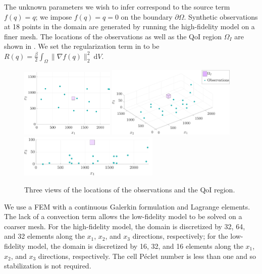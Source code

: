 \documentclass[review,sort&compress]{elsarticle}
\providecommand{\DIFaddtex}[1]{{\protect\color{blue}\uwave{#1}}} %
\providecommand{\DIFdeltex}[1]{{\protect\color{red}\sout{#1}}}                      %
\providecommand{\DIFaddbegin}{} %
\providecommand{\DIFaddend}{} %
\providecommand{\DIFdelbegin}{} %
\providecommand{\DIFdelend}{} %
\providecommand{\DIFadd}[1]{\texorpdfstring{\DIFaddtex{#1}}{#1}} %
\providecommand{\DIFdel}[1]{\texorpdfstring{\DIFdeltex{#1}}{}} %
\newcommand{\DIFscaledelfig}{0.5}
\newlength{\DIFdelgraphicswidth} %
\newlength{\DIFdelgraphicsheight} %
\newcommand{\DIFaddincludegraphics}[2][]{{\color{blue}\fbox{\DIFOincludegraphics[#1]{#2}}}} %
\newcommand{\DIFdelincludegraphics}[2][]{%
\sbox{\DIFdelgraphicsbox}{\DIFOincludegraphics[#1]{#2}}%
\settoboxwidth{\DIFdelgraphicswidth}{\DIFdelgraphicsbox} %
\settoboxtotalheight{\DIFdelgraphicsheight}{\DIFdelgraphicsbox} %
\scalebox{\DIFscaledelfig}{%
\parbox[b]{\DIFdelgraphicswidth}{\usebox{\DIFdelgraphicsbox}\\[-\baselineskip] \rule{\DIFdelgraphicswidth}{0em}}\llap{\resizebox{\DIFdelgraphicswidth}{\DIFdelgraphicsheight}{%
\setlength{\unitlength}{\DIFdelgraphicswidth}%
\begin{picture}(1,1)%
\thicklines\linethickness{2pt} %
{\color[rgb]{1,0,0}\put(0,0){\framebox(1,1){}}}%
{\color[rgb]{1,0,0}\put(0,0){\line( 1,1){1}}}%
{\color[rgb]{1,0,0}\put(0,1){\line(1,-1){1}}}%
\end{picture}%
}\hspace*{3pt}}} %
} %
\DeclareRobustCommand{\DIFaddbegin}{\DIFOaddbegin \let\includegraphics\DIFaddincludegraphics} %
\DeclareRobustCommand{\DIFaddend}{\DIFOaddend \let\includegraphics\DIFOincludegraphics} %
\DeclareRobustCommand{\DIFdelbegin}{\DIFOdelbegin \let\includegraphics\DIFdelincludegraphics} %
\DeclareRobustCommand{\DIFdelend}{\DIFOaddend \let\includegraphics\DIFOincludegraphics} %
\begin{document}
The unknown parameters we wish to infer correspond to the source term $f(q)=q$; we impose $f(q)=q=0$ on the boundary $\partial\Omega$. Synthetic observations at 18 points in the domain are generated by running the high-fidelity model on a finer mesh. The locations of the observations as well as the QoI region \DIFdelbegin \DIFdel{$\Omega_I$ }\DIFdelend \DIFaddbegin \DIFadd{$\Omega_I=[1100\textrm{m},1200\textrm{m}]\times[775\textrm{m},875\textrm{m}]\times[80\textrm{m},100\textrm{m}]$ }\DIFaddend are shown in . We set the regularization term in  to be $R(q)=\frac{\beta}{2}\int_\Omega \|\nabla f(q)\|_2^2\:\textrm{d}V$.
%
\begin{figure}[htbp]
\centering
\includegraphics[width=0.4\textwidth]{series3D/setup_aerial_nolegend.pdf} \hfill
\includegraphics[width=0.55\textwidth]{series3D/setup_3view.pdf} \\
\vspace{\baselineskip}
\includegraphics[width=0.6\textwidth]{series3D/setup_side_view.pdf}
\caption{Three views of the locations of the observations and the QoI region.}
\label{fig:setup3D}
\end{figure}
%

We use a FEM with a continuous Galerkin formulation and Lagrange elements. The lack of a convection term allows the low-fidelity model to be solved on a coarser mesh. For the high-fidelity model, the domain is discretized by 32, 64, and 32 elements along the $x_1$, $x_2$, and $x_3$ directions, respectively; for the low-fidelity model, the domain is discretized by 16, 32, and 16 elements along the $x_1$, $x_2$, and $x_3$ directions, respectively. The cell P\'{e}clet number is less than one and so stabilization is not required.
\end{document}
